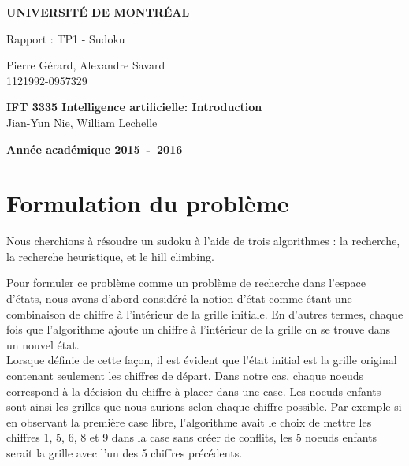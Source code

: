 \documentclass[a4paper,10pt]{article}
\begin{document}
\begin{titlepage}
\begin{center}
\textbf{\textsc{UNIVERSIT\'E DE MONTR\'EAL}}\\
\vfill{}\vfill{}
\begin{center}{\Huge Rapport : TP1 - Sudoku}\end{center}{\Huge \par}
\begin{center}{\large Pierre Gérard, Alexandre Savard \\ 1121992-0957329}\end{center}{\Huge \par}
\vfill{}\vfill{} \vfill{}
\begin{center}{\large \textbf{IFT 3335 Intelligence artificielle: Introduction}}\hfill{\\Jian-Yun Nie, William Lechelle}\end{center}{\large\par}
\vfill{}\vfill{}\enlargethispage{3cm}
\textbf{Année académique 2015~-~2016}
\end{center}
\end{titlepage}



\tableofcontents

\pagebreak


\section{Formulation du problème}
Nous cherchions à résoudre un sudoku à l'aide de trois algorithmes : la recherche, la recherche heuristique, et le hill climbing. 

Pour formuler ce problème comme un problème de recherche dans l'espace d'états, nous avons d'abord considéré la notion d'état comme étant une combinaison de chiffre à l'intérieur de la grille initiale. En d'autres termes, chaque fois que l'algorithme ajoute un chiffre à l'intérieur de la grille on se trouve dans un nouvel état. \\

Lorsque définie de cette façon, il est évident que l'état initial est la grille original contenant seulement les chiffres de départ. Dans notre cas, chaque noeuds correspond à la décision du chiffre à placer dans une case. Les noeuds enfants sont ainsi les grilles que nous aurions selon chaque chiffre possible. Par exemple si en observant la première case libre, l'algorithme avait le choix de mettre les chiffres 1, 5, 6, 8 et 9 dans la case sans créer de conflits, les 5 noeuds enfants serait la grille avec l'un des 5 chiffres précédents. \\
\end{document}
